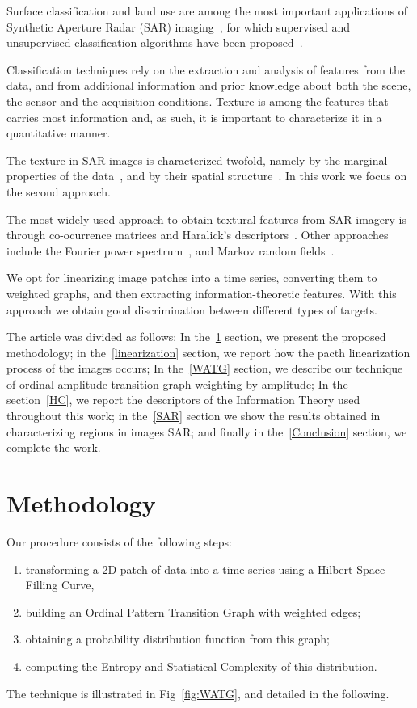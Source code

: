 \documentclass{isprs}
\begin{document}
	Surface classification and land use are among the most important applications of Synthetic Aperture Radar (SAR) imaging~\citep{Pottier2004Unsupervised}, for which supervised and unsupervised classification algorithms have been proposed~\citep{Bhattacharya2018Unsupervised,Chen1996multifrequency,ZYL1992Bayesian}.
	
	Classification techniques rely on the extraction and analysis of features from the data, and from additional information and prior knowledge about both the scene, the sensor and the acquisition conditions.
	Texture is among the features that carries most information and, as such, it is important to characterize it in a quantitative manner.
	
	The texture in SAR images is characterized twofold, namely by the marginal properties of the data~\citep{adrian96}, and by their spatial structure~\citep{FeaturesCropDiscrimination}.
	In this work we focus on the second approach.
	
	The most widely used approach to obtain textural features from SAR imagery is through co-ocurrence matrices and Haralick's descriptors~\citep{Zakeri2017Texture}.
	Other approaches include the Fourier power spectrum~\citep{Florindo2012Fractal}, and
	Markov random fields~\citep{Deng2005UnsupervisedSO}.
	
	We opt for linearizing image patches into a time series, converting them to weighted graphs, and then extracting information-theoretic features.
	With this approach we obtain good discrimination between different types of targets.
	
	The article was divided as follows:
	In the~\ref{methodology} section, we present the proposed methodology;
	in the~\ref{linearization} section, we report how the pacth linearization process of the images occurs;
	In the~\ref{WATG} section, we describe our technique of ordinal amplitude transition graph weighting by amplitude;
	In the section~\ref{HC}, we report the descriptors of the Information Theory used throughout this work;
	in the~\ref{SAR} section we show the results obtained in characterizing regions in images SAR;
	and finally in the~\ref{Conclusion} section, we complete the work.
	
	\section{Methodology}\label{methodology}
	
	Our procedure consists of the following steps:
	\begin{enumerate}
		\item\label{item:Linearlize} transforming a 2D patch of data into a time series using a Hilbert Space Filling Curve,
		\item\label{item:WOPTG} building an Ordinal Pattern Transition Graph with weighted edges;
		\item\label{item:Probability} obtaining a probability distribution function from this graph;
		\item\label{item:Descriptors} computing the Entropy and Statistical Complexity of this distribution.
	\end{enumerate}
	The technique is illustrated in Fig~\ref{fig:WATG}, and detailed in the following.
	
\end{document}
